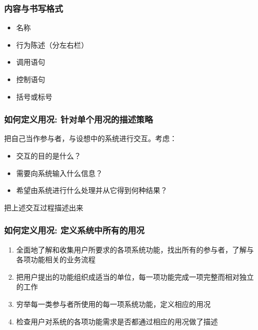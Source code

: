 \documentclass[compress]{beamer}
\newcommand{\textblue}[1]{\textcolor{blue}{#1}}
\begin{document}
\begin{frame}
  \frametitle{内容与书写格式}
    \begin{itemize}
      \item 名称
      \item 行为陈述（分左右栏）
      \item 调用语句
      \item 控制语句
      \item 括号或标号
    \end{itemize}
\end{frame}


{

\begin{frame}[plain]
\verbcase
\end{frame}
}

\begin{frame}
  \frametitle{如何定义用况: 针对单个用况的描述策略}
把自己当作参与者，与设想中的系统进行交互。考虑：
\begin{itemize}
  \item 交互的目的是什么？
  \item 需要向系统输入什么信息？
  \item 希望由系统进行什么处理并从它得到何种结果？
\end{itemize}

把上述交互过程描述出来 
\end{frame}

\begin{frame}
  \frametitle{如何定义用况: 定义系统中所有的用况}
  \begin{enumerate}
\item 全面地了解和收集用户所要求的各项系统功能，找出所有的参与者，了解与
各项功能相关的业务流程
\item 把用户提出的功能组织成适当的单位，每一项功能完成一项完整而相对独立
的工作
\item 穷举每一类参与者所使用的每一项系统功能，定义相应的用况
\item 检查用户对系统的各项功能需求是否都通过相应的用况做了描述
\end{enumerate}
\end{frame}
\end{document}
